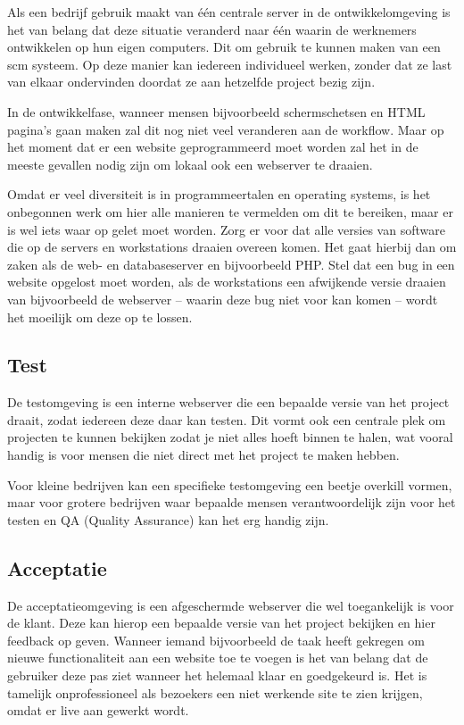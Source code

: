 Als een bedrijf gebruik maakt van één centrale server in de ontwikkelomgeving is het van belang dat deze situatie veranderd naar één waarin de werknemers ontwikkelen op hun eigen computers. Dit om gebruik te kunnen maken van een {\sc scm} systeem. Op deze manier kan iedereen individueel werken, zonder dat ze last van elkaar ondervinden doordat ze aan hetzelfde project bezig zijn.

In de ontwikkelfase, wanneer mensen bijvoorbeeld schermschetsen en HTML pagina's gaan maken zal dit nog niet veel veranderen aan de workflow. Maar op het moment dat er een website geprogrammeerd moet worden zal het in de meeste gevallen nodig zijn om lokaal ook een webserver te draaien. 

Omdat er veel diversiteit is in programmeertalen en operating systems, is het onbegonnen werk om hier alle manieren te vermelden om dit te bereiken, maar er is wel iets waar op gelet moet worden. Zorg er voor dat alle versies van software die op de servers en workstations draaien overeen komen. Het gaat hierbij dan om zaken als de web- en databaseserver en bijvoorbeeld PHP. Stel dat een bug in een website opgelost moet worden, als de workstations een afwijkende versie draaien van bijvoorbeeld de webserver -- waarin deze bug niet voor kan komen -- wordt het moeilijk om deze op te lossen.

\subsection{Test}

De testomgeving is een interne webserver die een bepaalde versie van het project draait, zodat iedereen deze daar kan testen. Dit vormt ook een centrale plek om projecten te kunnen bekijken zodat je niet alles hoeft binnen te halen, wat vooral handig is voor mensen die niet direct met het project te maken hebben.

Voor kleine bedrijven kan een specifieke testomgeving een beetje overkill vormen, maar voor grotere bedrijven waar bepaalde mensen verantwoordelijk zijn voor het testen en QA (Quality Assurance) kan het erg handig zijn.

\subsection{Acceptatie}

De acceptatieomgeving is een afgeschermde webserver die wel toegankelijk is voor de klant. Deze kan hierop een bepaalde versie van het project bekijken en hier feedback op geven. Wanneer iemand bijvoorbeeld de taak heeft gekregen om nieuwe functionaliteit aan een website toe te voegen is het van belang dat de gebruiker deze pas ziet wanneer het helemaal klaar en goedgekeurd is. Het is tamelijk onprofessioneel als bezoekers een niet werkende site te zien krijgen, omdat er live aan gewerkt wordt.

